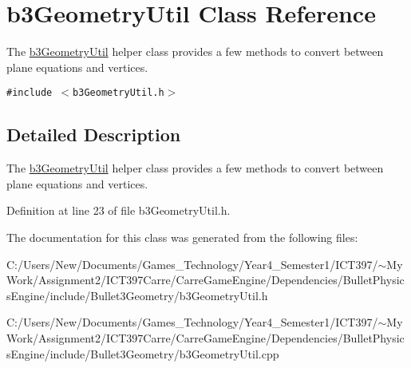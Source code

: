 \hypertarget{classb3_geometry_util}{
\section{b3GeometryUtil Class Reference}
\label{classb3_geometry_util}
}
The \hyperlink{classb3_geometry_util}{b3GeometryUtil} helper class provides a few methods to convert between plane equations and vertices.  


{\tt \#include $<$b3GeometryUtil.h$>$}



\subsection{Detailed Description}
The \hyperlink{classb3_geometry_util}{b3GeometryUtil} helper class provides a few methods to convert between plane equations and vertices. 

Definition at line 23 of file b3GeometryUtil.h.

The documentation for this class was generated from the following files:\begin{CompactItemize}
\item 
C:/Users/New/Documents/Games\_\-Technology/Year4\_\-Semester1/ICT397/$\sim$My Work/Assignment2/ICT397Carre/CarreGameEngine/Dependencies/BulletPhysicsEngine/include/Bullet3Geometry/b3GeometryUtil.h\item 
C:/Users/New/Documents/Games\_\-Technology/Year4\_\-Semester1/ICT397/$\sim$My Work/Assignment2/ICT397Carre/CarreGameEngine/Dependencies/BulletPhysicsEngine/include/Bullet3Geometry/b3GeometryUtil.cpp\end{CompactItemize}
